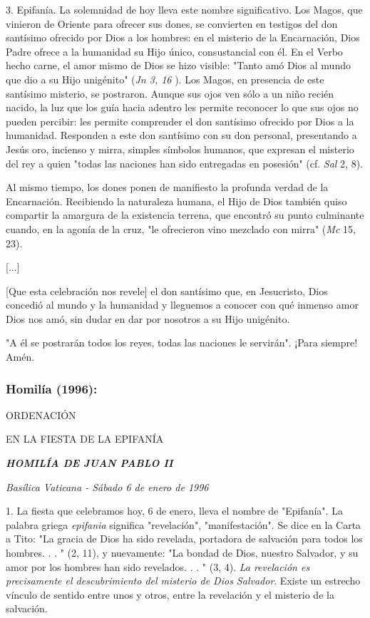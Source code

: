 \begin{body}
3. Epifanía. La solemnidad de hoy lleva este nombre significativo. Los Magos, que vinieron de Oriente para ofrecer sus dones, se convierten en testigos del don santísimo ofrecido por Dios a los hombres: en el misterio de la Encarnación, Dios Padre ofrece a la humanidad su Hijo único, consustancial con él. En el Verbo hecho carne, el amor mismo de Dios se hizo visible: "Tanto amó Dios al mundo que dio a su Hijo unigénito" (\emph{Jn 3, 16} ). Los Magos, en presencia de este santísimo misterio, se postraron. Aunque sus ojos ven sólo a un niño recién nacido, la luz que los guía hacia adentro les permite reconocer lo que sus ojos no pueden percibir: les permite comprender el don santísimo ofrecido por Dios a la humanidad. Responden a este don santísimo con su don personal, presentando a Jesús oro, incienso y mirra, simples símbolos humanos, que expresan el misterio del rey a quien "todas las naciones han sido entregadas en posesión" (cf. \emph{Sal} 2, 8).

Al mismo tiempo, los dones ponen de manifiesto la profunda verdad de la Encarnación. Recibiendo la naturaleza humana, el Hijo de Dios también quiso compartir la amargura de la existencia terrena, que encontró su punto culminante cuando, en la agonía de la cruz, "le ofrecieron vino mezclado con mirra" (\emph{Mc} 15, 23).

{[}...{]}

{[}Que esta celebración nos revele{]} el don santísimo que, en Jesucristo, Dios concedió al mundo y la humanidad y lleguemos a conocer con qué inmenso amor Dios nos amó, sin dudar en dar por nosotros a su Hijo unigénito.

"A él se postrarán todos los reyes, todas las naciones le servirán". ¡Para siempre! Amén.

\subsubsection{Homilía (1996): } ORDENACIÓN

EN LA FIESTA DE LA EPIFANÍA

\emph{\textbf{HOMILÍA DE JUAN PABLO II}}

\emph{Basílica Vaticana - Sábado 6 de enero de 1996}

1. La fiesta que celebramos hoy, 6 de enero, lleva el nombre de "Epifanía". La palabra griega \emph{epifania} significa "revelación", "manifestación". Se dice en la Carta a Tito: "La gracia de Dios ha sido revelada, portadora de salvación para todos los hombres. . . " (2, 11), y nuevamente: "La bondad de Dios, nuestro Salvador, y su amor por los hombres han sido revelados. . . " (3, 4). \emph{La revelación es precisamente el descubrimiento del misterio de Dios Salvador}. Existe un estrecho vínculo de sentido entre unos y otros, entre la revelación y el misterio de la salvación.


\end{body}
